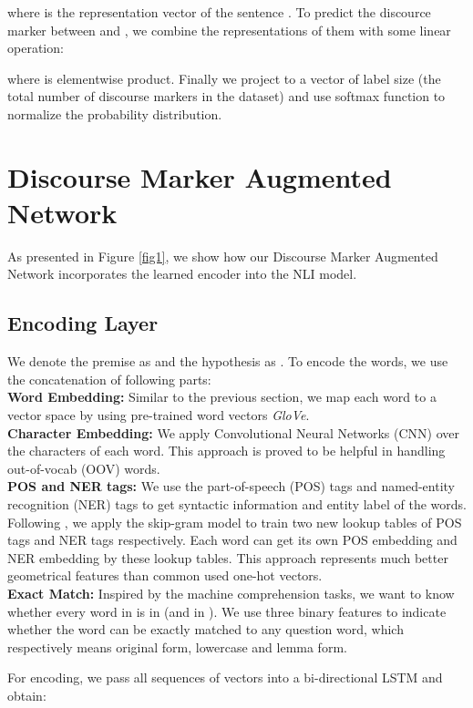 \documentclass[11pt,letterpaper]{article}
\begin{document}
where  is the representation vector of the sentence . To predict the discource marker between  and , we combine the representations of them with some linear operation:

where  is elementwise product. Finally we project  to a vector of label size (the total number of discourse markers in the dataset) and use softmax function to normalize the probability distribution.




\section{Discourse Marker Augmented Network}
As presented in Figure \ref{fig1}, we show how our Discourse Marker Augmented Network incorporates the learned encoder into the NLI model. 

\subsection{Encoding Layer}
We denote the premise as  and the hypothesis as . To encode the words, we use the concatenation of following parts:\\
\textbf{Word Embedding: }Similar to the previous section, we map each word to a vector space by using pre-trained word vectors \emph{GloVe}.\\
\textbf{Character Embedding: }We apply Convolutional Neural Networks (CNN) over the characters of each word. This approach is proved to be helpful in handling out-of-vocab (OOV) words\cite{Yang2016Words}.\\
\textbf{POS and NER tags: }We use the part-of-speech (POS) tags and named-entity recognition (NER) tags to get syntactic information and entity label of the words. Following \cite{pan2017memen}, we apply the skip-gram model\cite{mikolov2013distributed} to train two new lookup tables of POS tags and NER tags respectively. Each word can get its own POS embedding and NER embedding by these lookup tables. This approach represents much better geometrical features than common used one-hot vectors.\\
\textbf{Exact Match: }Inspired by the machine comprehension tasks\cite{Chen2017Reading}, we want to know whether every word in  is in  (and  in ). We use three binary features to indicate whether the word can be exactly matched to any question word, which respectively means original form, lowercase and lemma form.

For encoding, we pass all sequences of vectors into a bi-directional LSTM and obtain:
\end{document}
